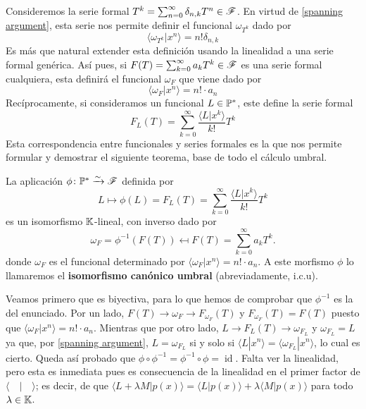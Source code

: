 Consideremos la serie formal $T^k = \sum_{n=0}^{\infty} \delta_{n,k} T^{n} \in \mathscr{F}$. En virtud de \ref{spanning argument}, esta serie nos permite definir el funcional $\omega_{T^k}$ dado por
\begin{equation}\label{omegaT^k}
    \langle \omega_{T^k} | x^n \rangle = n! \delta_{n,k}
\end{equation}
Es más que natural extender esta definición usando la linealidad a una serie formal genérica. Así pues, si $F(T) = \sum_{k=0}^\infty a_k T^k \in \mathscr{F}$ es una serie formal cualquiera, esta definirá el funcional $\omega_F$ que viene dado por
\begin{equation} \label{omegaF}
    \langle \omega_F | x^n \rangle = n! \cdot a_n
\end{equation}
Recíprocamente, si consideramos un funcional $L \in \mathbb{P}^*$, este define la serie formal
\begin{equation}\label{F_L}
    F_L(T) = \sum_{k=0}^\infty \frac{ \langle L | x^k \rangle}{k!} T^k 
\end{equation}
Esta correspondencia entre funcionales y series formales es la que nos permite formular y demostrar el siguiente teorema, base de todo el cálculo umbral.

\begin{teorema} 
    La aplicación $\phi \colon  \mathbb{P}^* \xrightarrow{\sim} \mathscr{F}$ definida por
    \[
        L \mapsto \phi (L) = F_L(T) = \sum_{k=0}^\infty \frac{ \langle L | x^k \rangle}{k!} T^k
    \]
	es un isomorfismo $\mathbb{K}$-lineal, con inverso dado por 
	\[
		\omega_F = \phi^{-1}(F(T)) \mapsfrom F(T) = \sum_{k=0}^\infty a_k T^k.
	\]
	donde $\omega_{F}$ es el funcional determinado por $\langle \omega_F | x^n \rangle = n! \cdot a_n$.
A este morfismo $\phi$ lo llamaremos el \textbf{isomorfismo canónico umbral} (abreviadamente, i.c.u).
\end{teorema}
\begin{demo}
    Veamos primero que es biyectiva, para lo que hemos de comprobar que $\phi^{-1}$ es la del enunciado. Por un lado,  $F(T) \longrightarrow \omega_F \longrightarrow F_{\omega_F}(T)$ y $F_{\omega_F}(T) = F(T)$ puesto que $\langle \omega_F | x^n \rangle = n! \cdot a_n$. Mientras que por otro lado, $L \longrightarrow F_L(T) \longrightarrow \omega_{F_L}$ y $\omega_{F_L} = L$ ya que, por \ref{spanning argument}, $L = \omega_{F_L}$ si y solo si $\langle L | x^n \rangle = \langle \omega_{F_L} | x^n \rangle$, lo cual es cierto. Queda así probado que $\phi \circ \phi^{-1} = \phi^{-1} \circ \phi = \operatorname{id}$. Falta ver la linealidad, pero esta es inmediata pues es consecuencia de la linealidad en el primer factor de $\langle \quad | \quad \rangle$; es decir, de que $\langle L + \lambda M | p(x) \rangle = \langle L | p(x) \rangle + \lambda \langle M | p(x) \rangle $ para todo $\lambda \in \mathbb{K}$.
\end{demo}

